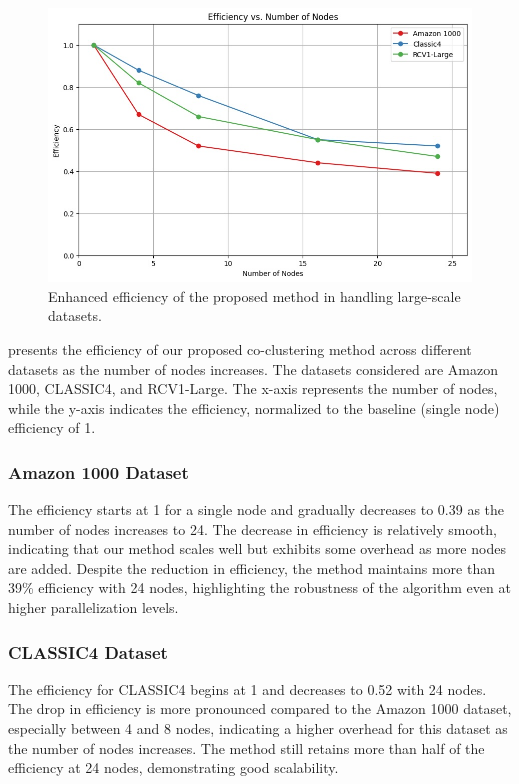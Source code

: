 \documentclass[journal]{IEEEtran}
\begin{document}
\begin{figure}[htbp]
  \centering
  \includegraphics[width=0.8\linewidth]{efficiency.jpg}
  \caption{Enhanced efficiency of the proposed method in handling large-scale datasets.}
  \label{fig:efficiency}
\end{figure}

 presents the efficiency of our proposed co-clustering method across different datasets as the number of nodes increases. The datasets considered are Amazon 1000, CLASSIC4, and RCV1-Large. The x-axis represents the number of nodes, while the y-axis indicates the efficiency, normalized to the baseline (single node) efficiency of 1.

\subsubsection{Amazon 1000 Dataset}
The efficiency starts at 1 for a single node and gradually decreases to 0.39 as the number of nodes increases to 24. The decrease in efficiency is relatively smooth, indicating that our method scales well but exhibits some overhead as more nodes are added. Despite the reduction in efficiency, the method maintains more than 39\% efficiency with 24 nodes, highlighting the robustness of the algorithm even at higher parallelization levels.

\subsubsection{CLASSIC4 Dataset}
The efficiency for CLASSIC4 begins at 1 and decreases to 0.52 with 24 nodes. The drop in efficiency is more pronounced compared to the Amazon 1000 dataset, especially between 4 and 8 nodes, indicating a higher overhead for this dataset as the number of nodes increases. The method still retains more than half of the efficiency at 24 nodes, demonstrating good scalability.
\end{document}
